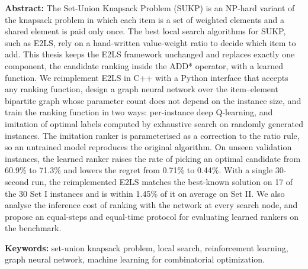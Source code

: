 \textbf{Abstract:} The Set-Union Knapsack Problem (SUKP) is an NP-hard variant of the knapsack problem in which each item is a set of weighted elements and a shared element is paid only once. The best local search algorithms for SUKP, such as E2LS, rely on a hand-written value-weight ratio to decide which item to add. This thesis keeps the E2LS framework unchanged and replaces exactly one component, the candidate ranking inside the ADD* operator, with a learned function. We reimplement E2LS in C++ with a Python interface that accepts any ranking function, design a graph neural network over the item--element bipartite graph whose parameter count does not depend on the instance size, and train the ranking function in two ways: per-instance deep Q-learning, and imitation of optimal labels computed by exhaustive search on randomly generated instances. The imitation ranker is parameterised as a correction to the ratio rule, so an untrained model reproduces the original algorithm. On unseen validation instances, the learned ranker raises the rate of picking an optimal candidate from 60.9\% to 71.3\% and lowers the regret from 0.71\% to 0.44\%. With a single 30-second run, the reimplemented E2LS matches the best-known solution on 17 of the 30 Set I instances and is within 1.45\% of it on average on Set II. We also analyse the inference cost of ranking with the network at every search node, and propose an equal-steps and equal-time protocol for evaluating learned rankers on the benchmark.

\textbf{Keywords:} set-union knapsack problem, local search, reinforcement learning, graph neural network, machine learning for combinatorial optimization.

\newpage

